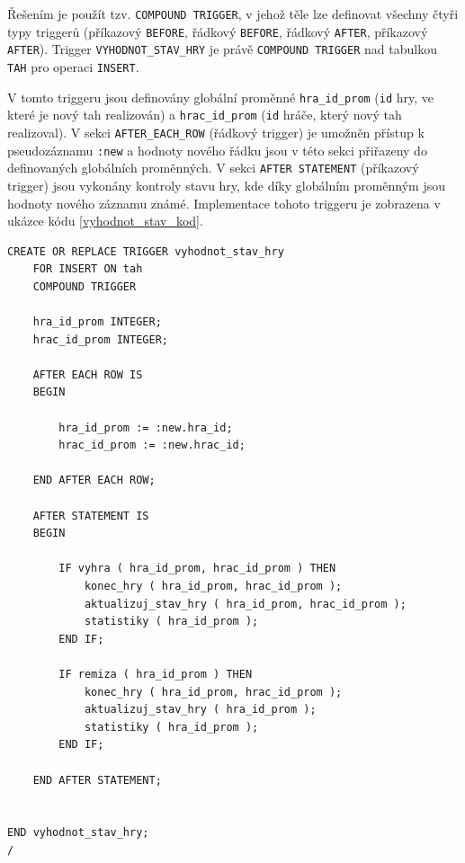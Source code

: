 \documentclass[
11pt,
a4paper,
pdftex,
czech,
titlepage
]{report}
\begin{document}
Řešením je použít tzv. \texttt{COMPOUND TRIGGER}, v jehož těle lze definovat všechny čtyři typy triggerů (příkazový \texttt{BEFORE}, řádkový \texttt{BEFORE}, řádkový \texttt{AFTER}, příkazový \texttt{AFTER}). Trigger \texttt{VYHODNOT\_STAV\_HRY} je právě \texttt{COMPOUND TRIGGER} nad tabulkou \texttt{TAH} pro operaci \texttt{INSERT}. 
\begin{sloppypar}
V tomto triggeru jsou definovány globální proměnné \texttt{hra\_id\_prom} (\texttt{id} hry, ve které je nový tah realizován) a \texttt{hrac\_id\_prom} (\texttt{id} hráče, který nový tah realizoval). V sekci \texttt{AFTER\_EACH\_ROW} (řádkový trigger) je umožněn přístup k pseudozáznamu \texttt{:new} a hodnoty nového řádku jsou v této sekci přiřazeny do definovaných globálních proměnných. V sekci \texttt{AFTER STATEMENT} (příkazový trigger) jsou vykonány kontroly stavu hry, kde díky globálním proměnným jsou hodnoty nového záznamu známé. Implementace tohoto triggeru je zobrazena v ukázce kódu \ref{vyhodnot_stav_kod}.\end{sloppypar}

\renewcommand{\lstlistingname}{Ukázka kódu}
\begin{lstlisting}
CREATE OR REPLACE TRIGGER vyhodnot_stav_hry
    FOR INSERT ON tah
    COMPOUND TRIGGER
    
    hra_id_prom INTEGER;
    hrac_id_prom INTEGER;
    
    AFTER EACH ROW IS
    BEGIN
    
        hra_id_prom := :new.hra_id;
        hrac_id_prom := :new.hrac_id;
        
    END AFTER EACH ROW;
    
    AFTER STATEMENT IS
    BEGIN
    
        IF vyhra ( hra_id_prom, hrac_id_prom ) THEN
            konec_hry ( hra_id_prom, hrac_id_prom );
            aktualizuj_stav_hry ( hra_id_prom, hrac_id_prom );
            statistiky ( hra_id_prom );
        END IF;
    
        IF remiza ( hra_id_prom ) THEN
            konec_hry ( hra_id_prom, hrac_id_prom );
            aktualizuj_stav_hry ( hra_id_prom );
            statistiky ( hra_id_prom );
        END IF;
    
    END AFTER STATEMENT;

    
END vyhodnot_stav_hry;
/
\end{lstlisting}
\end{document}
